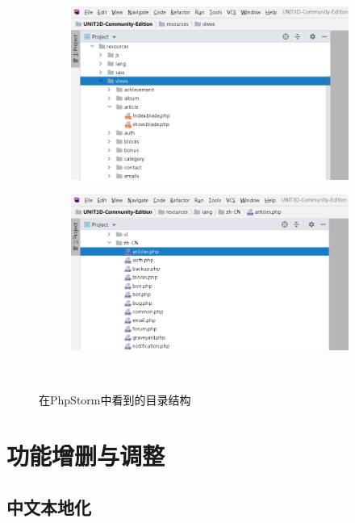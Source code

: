 \begin{figure}[!ht]
    \begin{subfigure}{0.3\textwidth}
		\centering
		\includegraphics[width=\textwidth]{support-files/3.1-phpstorm-folder-structure-5.png}
		\caption{ }
		\label{fig:torrent_in_bencode}
	\end{subfigure}
	\makebox[0.05\textwidth]{}
    \begin{subfigure}{0.3\textwidth}
		\centering
		\includegraphics[width=\textwidth]{support-files/3.1-phpstorm-folder-structure-6.png}
		\caption{ }
		\label{fig:torrent_in_bencode}
	\end{subfigure} \\
	\caption{在PhpStorm中看到的目录结构}
	\label{fig:phpstorm}
\end{figure}

\section{功能增删与调整}

\subsection{中文本地化}

